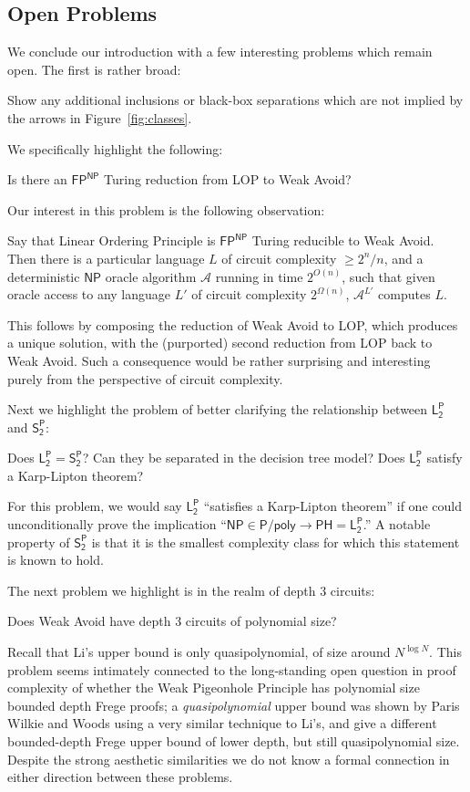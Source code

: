 \subsection{Open Problems}
We conclude our introduction with a few interesting problems which remain open. The first is rather broad:
\begin{problem}
Show any additional inclusions or black-box separations which are not implied by the arrows in Figure~\ref{fig:classes}.
\end{problem}
We specifically highlight the following:
\begin{problem}
Is there an $\mathsf{FP^{NP}}$ Turing reduction from LOP to Weak Avoid?
\end{problem}
Our interest in this problem is the following observation:
\begin{observation}
Say that Linear Ordering Principle is $\mathsf{FP^{NP}}$ Turing reducible to Weak Avoid. Then there is a particular language $L$ of circuit complexity $\geq 2^n/n$, and a deterministic $\mathsf{NP}$ oracle algorithm $\mathcal{A}$ running in time $2^{O(n)}$, such that given oracle access to any language $L'$ of circuit complexity $2^{\Omega(n)}$, $\mathcal{A}^{L'}$ computes $L$.
\end{observation}
This follows by composing the reduction of Weak Avoid to LOP, which produces a unique solution, with the (purported) second reduction from LOP back to Weak Avoid. Such a consequence would be rather surprising and interesting purely from the perspective of circuit complexity.

Next we highlight the problem of better clarifying the relationship between $\mathsf{L_2^P}$ and $\mathsf{S_2^P}$:
\begin{problem}
Does $\mathsf{L_2^P} = \mathsf{S_2^P}$? Can they be separated in the decision tree model? Does $\mathsf{L_2^P}$ satisfy a Karp-Lipton theorem?
\end{problem}
For this problem, we would say $\mathsf{L_2^P}$ ``satisfies a Karp-Lipton theorem'' if one could unconditionally prove the implication ``$\mathsf{NP} \in \mathsf{P/poly} \rightarrow \mathsf{PH}=\mathsf{L_2^P}$.'' A notable property of $\mathsf{S_2^P}$ is that it is the smallest complexity class for which this statement is known to hold.

The next problem we highlight is in the realm of depth 3 circuits:
\begin{problem}
Does Weak Avoid have depth 3 circuits of polynomial size?
\end{problem}
Recall that Li's upper bound is only quasipolynomial, of size around $N^{\log N}$. This problem seems intimately connected to the long-standing open question in proof complexity of whether the Weak Pigeonhole Principle has polynomial size bounded depth Frege proofs; a \emph{quasipolynomial} upper bound was shown by Paris Wilkie and Woods \cite{Paris-Wilkie-Woods} using a very similar technique to Li's, and \cite{MacielPW02} give a different bounded-depth Frege upper bound of lower depth, but still quasipolynomial size. Despite the strong aesthetic similarities we do not know a formal connection in either direction between these problems.


